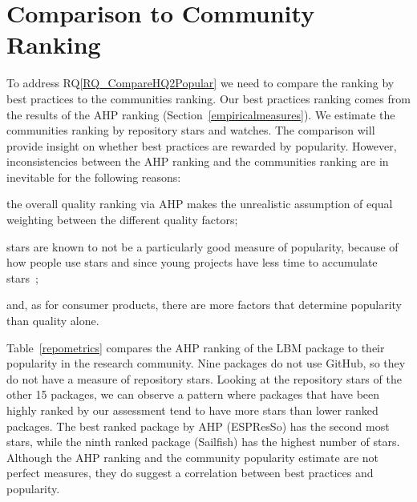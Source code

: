 \documentclass[runningheads]{llncs}
\newcommand{\rqref}[1]{RQ\ref{#1}}
\begin{document}
\section{Comparison to Community Ranking} \label{repmetrics}

To address \rqref{RQ_CompareHQ2Popular} we need to compare the ranking by best
practices to the communities ranking.  Our best practices ranking comes from the
results of the AHP ranking (Section~\ref{empiricalmeasures}).  We estimate the
communities ranking by repository stars and watches.  The comparison will
provide insight on whether best practices are rewarded by popularity.  However,
inconsistencies between the AHP ranking and the communities ranking are in
inevitable for the following reasons: 
\begin{inparaenum}[i)]
	\item the overall quality ranking via AHP makes the unrealistic assumption
	of equal weighting between the different quality factors;
	\item stars are known to not be a particularly good measure of popularity,
	because of how people use stars and since young projects have less time to
	accumulate stars~\cite{Szulik2017}; 
	\item and, as for consumer products, there are more factors that determine
	popularity than quality alone.
\end{inparaenum}

Table~\ref{repometrics} compares the AHP ranking of the LBM package to their
popularity in the research community.  Nine packages do not use GitHub, so they
do not have a measure of repository stars. Looking at the repository stars of
the other 15 packages, we can observe a pattern where packages that have been
highly ranked by our assessment tend to have more stars than lower ranked
packages. The best ranked package by AHP (ESPResSo) has the second most stars,
while the ninth ranked package (Sailfish) has the highest number of stars.
Although the AHP ranking and the community popularity estimate are not perfect
measures, they do suggest a correlation between best practices and popularity.
\end{document}
